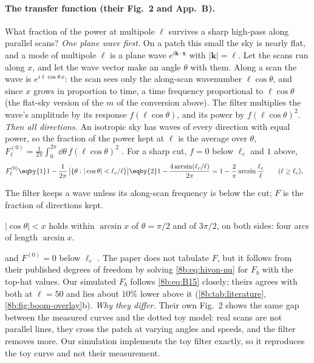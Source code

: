 \paragraph{The transfer function (their Fig.~2 and App.~B).}
What fraction of the power at multipole $\ell$ survives a sharp high-pass along parallel scans?
\emph{One plane wave first.} On a patch this small the sky is nearly flat, and a mode of multipole $\ell$ is a
plane wave $e^{i\bm k\cdot\bm x}$ with $|\bm k|=\ell$. Let the scans run along $x$, and let the wave vector make an angle
$\theta$ with them. Along a scan the wave is $e^{i\ell\cos\theta\,x}$: the scan sees only the along-scan wavenumber
$\ell\cos\theta$, and since $x$ grows in proportion to time, a time frequency proportional to $\ell\cos\theta$ (the
flat-sky version of the $m$ of the conversion above). The filter multiplies the wave's amplitude by its
response $f(\ell\cos\theta)$, and its power by $f(\ell\cos\theta)^2$. \emph{Then all directions.} An isotropic sky
has waves of every direction with equal power, so the fraction of the power kept at $\ell$ is the
average over $\theta$, $F^{(0)}_\ell=\frac1{2\pi}\int_0^{2\pi}\dd\theta\,f(\ell\cos\theta)^2$ . For a sharp cut,
$f=0$ below $\ell_c$ and $1$ above,
\begin{align}
  F^{(0)}_\ell
  &\eqby{1}1-\frac1{2\pi}\,\bigl|\{\theta:|\cos\theta|<\ell_c/\ell\}\bigr|
   \eqby{2}1-\frac{4\arcsin(\ell_c/\ell)}{2\pi}
   =1-\frac2\pi\arcsin\frac{\ell_c}\ell\qquad(\ell\ge\ell_c),
  \label{8b:eq:B15}
\end{align}
\begin{explain}
  \item The filter keeps a wave unless its along-scan frequency is below the cut; $F$ is the fraction of
        directions kept.
  \item $|\cos\theta|<x$ holds within $\arcsin x$ of $\theta=\pi/2$ and of $3\pi/2$, on both sides: four arcs of
        length $\arcsin x$.
\end{explain}
and $F^{(0)}=0$ below $\ell_c$ . The paper does not tabulate $F$, but it follows from
their published degrees of freedom by solving \eqref{8b:eq:hivon-nu} for $F_b$ with the top-hat values. Our
simulated $F_b$ follows \eqref{8b:eq:B15} closely; theirs agrees with both at $\ell=50$ and lies about $10\%$
lower above it (\cref{8b:tab:literature}, \cref{8b:fig:boom-overlay}b).
\emph{Why they differ.} Their own Fig.~2 shows the same gap between the measured curves and the dotted
toy model: real scans are not parallel lines, they cross the patch at varying angles and speeds, and
the filter removes more. Our simulation implements the toy filter exactly, so it reproduces the toy
curve and not their measurement.

